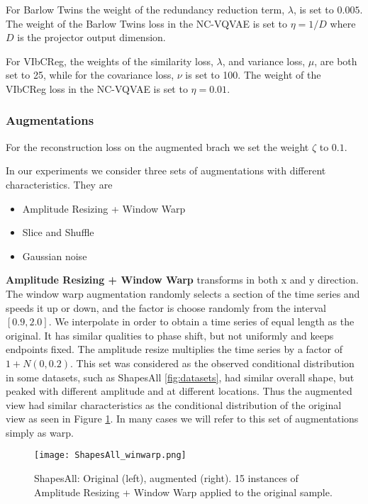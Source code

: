 \documentclass[../../thesis.tex]{subfiles}
\begin{document}
For Barlow Twins the weight of the redundancy reduction term, $\lambda$, is set to $0.005$. The weight of the Barlow Twins loss in the NC-VQVAE is set to $\eta = 1/D$ where $D$ is the projector output dimension.\newline

For VIbCReg, the weights of the similarity loss, $\lambda$, and variance loss, $\mu$, are both set to 25, while for the covariance loss, $\nu$ is set to 100. The weight of the VIbCReg loss in the NC-VQVAE is set to $\eta = 0.01$.

\subsubsection{Augmentations}
For the reconstruction loss on the augmented brach we set the weight $\zeta$ to $0.1$. \newline 

In our experiments we consider three sets of augmentations with different characteristics. They are
\begin{itemize}
    \item Amplitude Resizing + Window Warp
    \item Slice and Shuffle
    \item Gaussian noise
\end{itemize}

\textbf{Amplitude Resizing + Window Warp} transforms in both x and y direction. The window warp augmentation randomly selects a section of the time series and speeds it up or down, and the factor is choose randomly from the interval $[0.9, 2.0]$. We interpolate in order to obtain a time series of equal length as the original. It has similar qualities to phase shift, but not uniformly and keeps endpoints fixed. The amplitude resize multiplies the time series by a factor of $1+N(0,0.2)$. This set was considered as the observed conditional distribution in some datasets, such as ShapesAll \ref{fig:datasets}, had similar overall shape, but peaked with different amplitude and at different locations. Thus the augmented view had similar characteristics as the conditional distribution of the original view as seen in Figure \ref{fig:ShapesAll_winwarp}. In many cases we will refer to this set of augmentations simply as warp. \newline

\begin{figure}[h]
    \centering
    \texttt{[image: ShapesAll\_winwarp.png]}
    \caption{ShapesAll: Original (left), augmented (right). 15 instances of Amplitude Resizing + Window Warp applied to the original sample.}
    \label{fig:ShapesAll_winwarp}
\end{figure}
\end{document}

